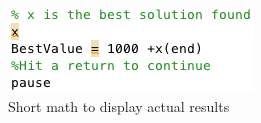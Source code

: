 \documentclass[a4paper, 10pt]{IEEEconf}
\begin{document}
\begin{figure}[H]
  \includegraphics[width=\linewidth, center]{images/code2}
  \caption{Short math to display actual results}
  \label{fig:Short math to display actual results}
\end{figure}
\end{document}
